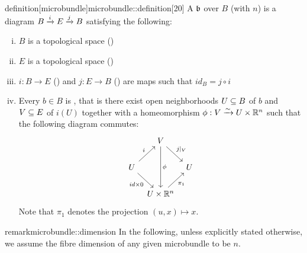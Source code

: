 \begin{mystatement}{definition}[microbundle]{microbundle::definition}[20]
    A  $\bb$ over $B$ (with  $n$)
    is a diagram $\bundle{B}{E}{i}{j}$ satisfying the following:
    \begin{enumerate}[(i)]
        \item $B$ is a topological space ()
        \item $E$ is a topological space ()
        \item $i: B \to E$ () and $j: E \to B$ ()
        are maps such that $id_B = j \circ i$
        \item Every $b \in B$ is ,
        that is there exist open neighborhoods $U \sub B$ of $b$ and $V \sub E$ of $i(U)$
        together with a homeomorphism $\phi: V \isomto U \cross \R^n$ such that the following diagram commutes:
        \[
            \begin{tikzcd}[column sep=tiny]
                & V \ar[dr, "j\vert_V"] \ar[dd, "\phi"] & \\
                U \ar[ur, "i"] \ar[dr, "{id \cross 0}"'] & & U \\
                & U \cross\R^n \ar[ur, "\pi_1"'] &
            \end{tikzcd}
        \]
        Note that $\pi_1$ denotes the projection $(u, x) \mapsto x$.
    \end{enumerate}
\end{mystatement}

\begin{mystatement}{remark}{microbundle::dimension}
    In the following, unless explicitly stated otherwise,
    we assume the fibre dimension of any given microbundle to be $n$.
\end{mystatement}